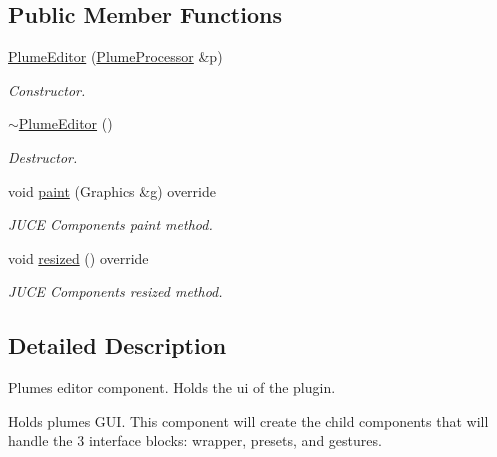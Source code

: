 \subsection*{Public Member Functions}
\begin{DoxyCompactItemize}
\item 
\mbox{\hyperlink{class_plume_editor_a0b9b4a952769836ca43c49ed020951f9}{Plume\+Editor}} (\mbox{\hyperlink{class_plume_processor}{Plume\+Processor}} \&p)
\begin{DoxyCompactList}\small\item\em Constructor. \end{DoxyCompactList}\item 
\mbox{\label{class_plume_editor_af16dd852a3419961627d070d62e3e644}} 
\mbox{\hyperlink{class_plume_editor_af16dd852a3419961627d070d62e3e644}{$\sim$\+Plume\+Editor}} ()
\begin{DoxyCompactList}\small\item\em Destructor. \end{DoxyCompactList}\item 
\mbox{\label{class_plume_editor_a3b31e2023faf921f446b132b24a917c0}} 
void \mbox{\hyperlink{class_plume_editor_a3b31e2023faf921f446b132b24a917c0}{paint}} (Graphics \&g) override
\begin{DoxyCompactList}\small\item\em J\+U\+CE Components\textquotesingle{} paint method. \end{DoxyCompactList}\item 
\mbox{\label{class_plume_editor_aa42064f898f3a543173c5b29c7b2932c}} 
void \mbox{\hyperlink{class_plume_editor_aa42064f898f3a543173c5b29c7b2932c}{resized}} () override
\begin{DoxyCompactList}\small\item\em J\+U\+CE Components\textquotesingle{} resized method. \end{DoxyCompactList}\end{DoxyCompactItemize}


\subsection{Detailed Description}
Plume\textquotesingle{}s editor component. Holds the ui of the plugin. 

Holds plumes G\+UI. This component will create the child components that will handle the 3 interface blocks\+: wrapper, presets, and gestures. 

